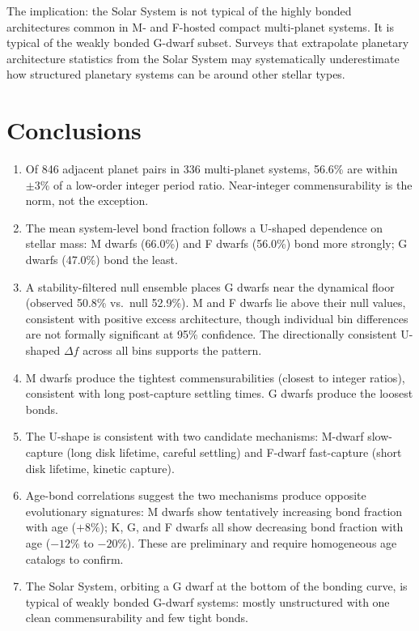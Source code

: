 \documentclass[twocolumn]{aastex631}
\begin{document}
The implication: the Solar System is not typical of the highly bonded
architectures common in M- and F-hosted compact multi-planet systems. It is
typical of the weakly bonded G-dwarf subset. Surveys that extrapolate
planetary architecture statistics from the Solar System may systematically
underestimate how structured planetary systems can be around other stellar
types.

\section{Conclusions}
\label{sec:conclusions}

\begin{enumerate}
  \item Of 846 adjacent planet pairs in 336 multi-planet systems, 56.6\% are
        within $\pm 3\%$ of a low-order integer period ratio. Near-integer
        commensurability is the norm, not the exception.
  \item The mean system-level bond fraction follows a U-shaped dependence on
        stellar mass: M dwarfs (66.0\%) and F dwarfs (56.0\%) bond more
        strongly; G dwarfs (47.0\%) bond the least.
  \item A stability-filtered null ensemble places G dwarfs near the dynamical
        floor (observed 50.8\% vs.\ null 52.9\%). M and F dwarfs lie above
        their null values, consistent with positive excess architecture,
        though individual bin differences are not formally significant at 95\%
        confidence. The directionally consistent U-shaped $\Delta f$ across all
        bins supports the pattern.
  \item M dwarfs produce the tightest commensurabilities (closest to integer
        ratios), consistent with long post-capture settling times. G dwarfs
        produce the loosest bonds.
  \item The U-shape is consistent with two candidate mechanisms: M-dwarf
        slow-capture (long disk lifetime, careful settling) and F-dwarf
        fast-capture (short disk lifetime, kinetic capture).
  \item Age-bond correlations suggest the two mechanisms produce opposite
        evolutionary signatures: M dwarfs show tentatively increasing bond
        fraction with age ($+8\%$); K, G, and F dwarfs all show decreasing
        bond fraction with age ($-12\%$ to $-20\%$). These are preliminary and
        require homogeneous age catalogs to confirm.
  \item The Solar System, orbiting a G dwarf at the bottom of the bonding
        curve, is typical of weakly bonded G-dwarf systems: mostly unstructured
        with one clean commensurability and few tight bonds.
\end{enumerate}
\end{document}
